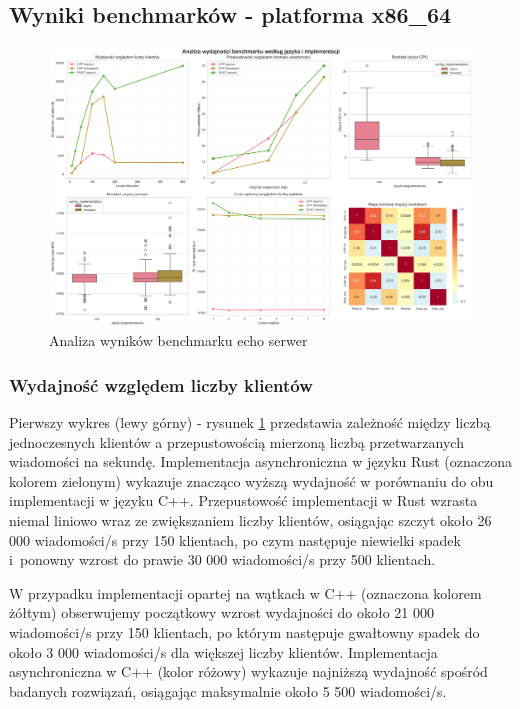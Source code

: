 \subsection{Wyniki benchmarków - platforma x86\_64}
\begin{figure}[H]
    \centering
    \includegraphics[width=\textwidth]{analiza/images/conc/echo/x86/analiza_benchmarku.png}
    \caption{Analiza wyników benchmarku echo serwer}
    \label{analiza_benchmarku_echo_serwer_x86_64}
\end{figure}

\subsubsection{Wydajność względem liczby klientów}
Pierwszy wykres (lewy górny) - rysunek \ref{analiza_benchmarku_echo_serwer_x86_64} przedstawia zależność między liczbą jednoczesnych klientów a przepustowością mierzoną liczbą przetwarzanych wiadomości na sekundę. Implementacja asynchroniczna w języku Rust (oznaczona kolorem zielonym) wykazuje znacząco wyższą wydajność w porównaniu do obu implementacji w języku C++. Przepustowość implementacji w Rust wzrasta niemal liniowo wraz ze zwiększaniem liczby klientów, osiągając szczyt około 26 000 wiadomości/s przy 150 klientach, po czym następuje niewielki spadek i~ponowny wzrost do prawie 30 000 wiadomości/s przy 500 klientach.

W przypadku implementacji opartej na wątkach w C++ (oznaczona kolorem żółtym) obserwujemy początkowy wzrost wydajności do około 21 000 wiadomości/s przy 150 klientach, po którym następuje gwałtowny spadek do około 3 000 wiadomości/s dla większej liczby klientów. Implementacja asynchroniczna w C++ (kolor różowy) wykazuje najniższą wydajność spośród badanych rozwiązań, osiągając maksymalnie około 5 500 wiadomości/s.

